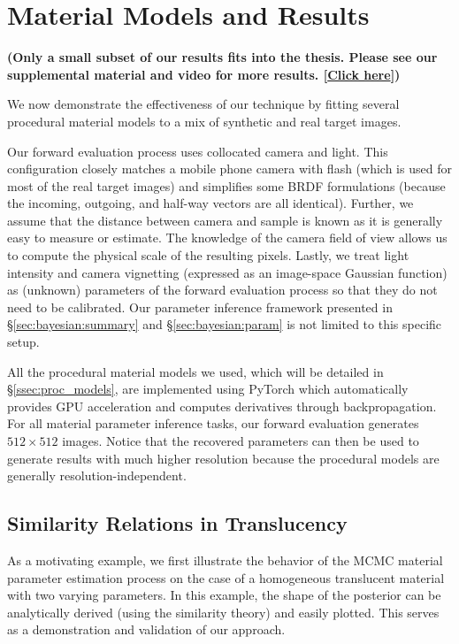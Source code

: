 \section{Material Models and Results}
\label{sec:bayesian:results}

\textbf{(Only a small subset of our results fits into the thesis. Please see our supplemental material and video for more results.
[\href{https://www.ics.uci.edu/~yug10/webpage/suppl/2020CGF/index.html}{Click here}])}


We now demonstrate the effectiveness of our technique by fitting several procedural material models to a mix of synthetic and real target images.

Our forward evaluation process uses collocated camera and light.
This configuration closely matches a mobile phone camera with flash (which is used for most of the real target images) and simplifies some BRDF formulations (because the incoming, outgoing, and half-way vectors are all identical).
Further, we assume that the distance between camera and sample is known as it is generally easy to measure or estimate.
The knowledge of the camera field of view allows us to compute the physical scale of the resulting pixels.
Lastly, we treat light intensity and camera vignetting (expressed as an image-space Gaussian function) as (unknown) parameters of the forward evaluation process so that they do not need to be calibrated.
Our parameter inference framework presented in \S\ref{sec:bayesian:summary} and \S\ref{sec:bayesian:param} is not limited to this specific setup.

All the procedural material models we used, which will be detailed in \S\ref{ssec:proc_models}, are implemented using \textsf{PyTorch} which automatically provides GPU acceleration and computes derivatives through backpropagation. 
For all material parameter inference tasks, our forward evaluation generates $512 \times 512$ images.
Notice that the recovered parameters can then be used to generate results with much higher resolution because the procedural models are generally resolution-independent.

\subsection{Similarity Relations in Translucency}

As a motivating example, we first illustrate the behavior of the MCMC material parameter estimation process on the case of a homogeneous translucent material with two varying parameters.
In this example, the shape of the posterior can be analytically derived (using the similarity theory) and easily plotted. This serves as a demonstration and validation of our approach.

